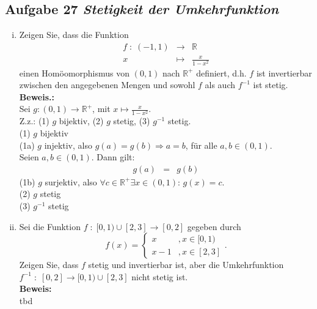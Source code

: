 \subsection*{Aufgabe 27 \mdseries\itshape Stetigkeit der Umkehrfunktion}

\begin{enumerate}[(i)]
   \item Zeigen Sie, dass die Funktion 
        $$\begin{array}{rcl}
            f \; : \; (-1,1) &\longrightarrow& \mathbb{R}\\
                x & \mapsto & \frac{x}{1 - x^2}
        \end{array}$$
        einen Homöomorphismus von $(0,1)$ nach $\mathbb{R}^+$ definiert, d.h. 
        $f$ ist invertierbar zwischen den angegebenen Mengen und sowohl $f$ als auch
        $f^{-1}$ ist stetig.\\

    \textbf{Beweis.:}\\
        Sei $g : (0,1) \to \mathbb{R}^+$, mit $x \mapsto \frac{x}{1 - x^2}$.\\
        Z.z.: (1) $g$ bijektiv, (2) $g$ stetig, (3) $g^{-1}$ stetig. \\

        (1) $g$ bijektiv \\
            (1a) $g$ injektiv, also $g(a) = g(b) \Rightarrow a = b$, für alle $a,b \in (0,1)$. \\
                Seien $a,b \in (0,1)$. Dann gilt:
                \begin{eqnarray*}
                  g(a) &=& g(b)
                \end{eqnarray*}
            (1b) $g$ surjektiv, also $\forall c \in \mathbb{R}^+ \exists x \in (0,1):\, g(x) = c$.\\
        (2) $g$ stetig \\
        (3) $g^{-1}$ stetig\\
    \item Sei die Funktion $f \; : \; [0,1) \cup [2,3] \rightarrow [0,2]$ gegeben durch
        $$
            f(x) = \left\{ \begin{array}{lr}
                x &, x\in [0,1)\\
                x-1 &, x \in [2,3]
            \end{array} \right. .
        $$
        Zeigen Sie, dass $f$ stetig und invertierbar ist, aber die Umkehrfunktion 
        $f^{-1} \; : \; [0,2] \rightarrow [0,1) \cup [2,3]$ nicht stetig ist.\\

    \textbf{Beweis:}\\
        tbd
\end{enumerate}
